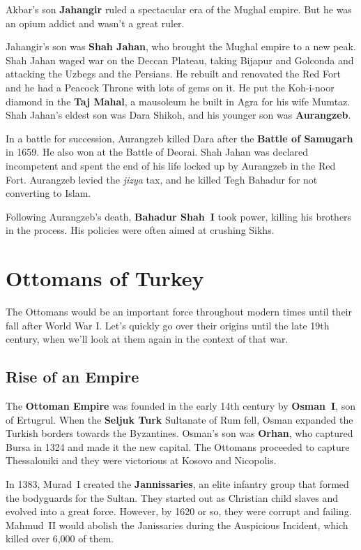 Akbar's son \textbf{Jahangir} ruled a spectacular era of the Mughal empire.
But he was an opium addict and wasn't a great ruler.

Jahangir's son was \textbf{Shah Jahan}, who brought the Mughal empire to a new peak.
Shah Jahan waged war on the Deccan Plateau,
taking Bijapur and Golconda and attacking the Uzbegs and the Persians.
He rebuilt and renovated the Red Fort and he had a Peacock Throne with lots of gems on it.
He put the Koh-i-noor diamond in the \textbf{Taj Mahal}, a mausoleum he built in Agra for his wife Mumtaz.
Shah Jahan's eldest son was Dara Shikoh, and his younger son was \textbf{Aurangzeb}.

In a battle for succession, Aurangzeb killed Dara after the \textbf{Battle of Samugarh} in 1659.
He also won at the Battle of Deorai.
Shah Jahan was declared incompetent and spent the end of his life locked up by Aurangzeb in the Red Fort.
Aurangzeb levied the \textit{jizya} tax, and he killed Tegh Bahadur for not converting to Islam.

Following Aurangzeb's death, \textbf{Bahadur Shah~I} took power, killing his brothers in the process.
His policies were often aimed at crushing Sikhs.

\section{Ottomans of Turkey}

The Ottomans would be an important force throughout modern times until their fall after World War I\@.
Let's quickly go over their origins until the late 19th century,
when we'll look at them again in the context of that war.

\subsection*{Rise of an Empire}

The \textbf{Ottoman Empire} was founded in the early 14th century by \textbf{Osman~I}, son of Ertugrul.
When the \textbf{Seljuk Turk} Sultanate of Rum fell, Osman expanded the Turkish borders towards the Byzantines.
Osman's son was \textbf{Orhan}, who captured Bursa in 1324 and made it the new capital.
The Ottomans proceeded to capture Thessaloniki and they were victorious at Kosovo and Nicopolis.

In 1383, Murad~I created the \textbf{Jannissaries}, an elite infantry group that formed the bodyguards for the Sultan.
They started out as Christian child slaves and evolved into a great force.
However, by 1620 or so, they were corrupt and failing.
Mahmud~II would abolish the Janissaries during the Auspicious Incident, which killed over 6,000 of them.

